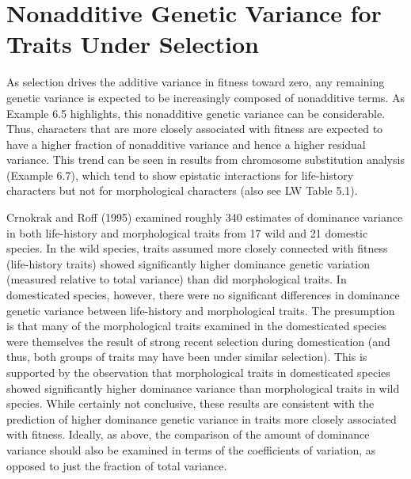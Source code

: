\documentclass{article}
\begin{document}
\section{Nonadditive Genetic Variance for Traits Under Selection}
As selection drives the additive variance in fitness toward zero, any remaining genetic variance is expected to be increasingly composed of nonadditive terms. As Example 6.5 highlights, this nonadditive genetic variance can be considerable. Thus, characters that are more closely associated with fitness are expected to have a higher fraction of nonadditive variance and hence a higher residual variance. This trend can be seen in results from chromosome substitution analysis (Example 6.7), which tend to show epistatic interactions for life-history characters but not for morphological characters (also see LW Table 5.1).

Crnokrak and Roff (1995) examined roughly 340 estimates of dominance variance in both life-history and morphological traits from 17 wild and 21 domestic species. In the wild species, traits assumed more closely connected with fitness (life-history traits) showed significantly higher dominance genetic variation (measured relative to total variance) than did morphological traits. In domesticated species, however, there were no significant differences in dominance genetic variance between life-history and morphological traits. The presumption is that many of the morphological traits examined in the domesticated species were themselves the result of strong recent selection during domestication (and thus, both groups of traits may have been under similar selection). This is supported by the observation that morphological traits in domesticated species showed significantly higher dominance variance than morphological traits in wild species. While certainly not conclusive, these results are consistent with the prediction of higher dominance genetic variance in traits more closely associated with fitness. Ideally, as above, the comparison of the amount of dominance variance should also be examined in terms of the coefficients of variation, as opposed to just the fraction of total variance.
\end{document}
